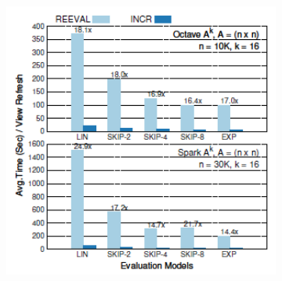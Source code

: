\begin{figure}[h]
\captionsetup[subfigure]{width=1\textwidth}
     \centering
    \begin{subfigure}{0.3\textwidth}
        \includegraphics[height = 1.5\textwidth, width=1.2\textwidth]{Figures/linview_matrix_power_exp.png}
        \caption{}
        \label{fig:linview_matrix_powers}
    \end{subfigure}
    \hfill
    \begin{subfigure}{0.3\textwidth}

\end{subfigure}
\end{figure}
